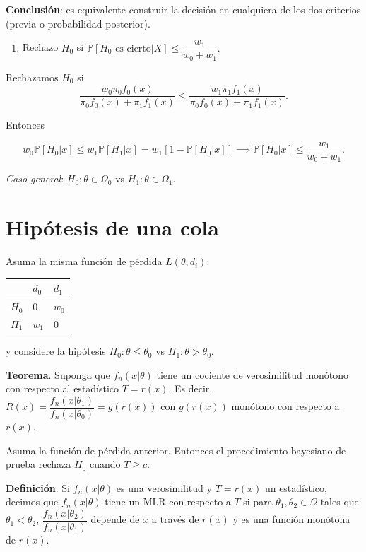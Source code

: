 \documentclass[
  12pt,
]{book}
\providecommand{\tightlist}{%
  \setlength{\itemsep}{0pt}\setlength{\parskip}{0pt}}
\begin{document}
\textbf{Conclusión}: es equivalente construir la decisión en cualquiera de los dos criterios (previa o probabilidad posterior).

\begin{enumerate}
\def\labelenumi{\alph{enumi}.}
\setcounter{enumi}{2}
\tightlist
\item
  Rechazo \(H_0\) si \(\mathbb P[H_0 \text{ es cierto}|X] \leq \dfrac{w_1}{w_0+w_1}.\)
\end{enumerate}

Rechazamos \(H_0\) si
\[\dfrac{w_0\pi_0f_0(x)}{\pi_0f_0(x)+\pi_1f_1(x)}\leq \dfrac{w_1\pi_1f_1(x)}{\pi_0f_0(x)+\pi_1f_1(x)}.\]

Entonces

\[w_0\mathbb P[H_0|x] \leq w_1\mathbb P[H_1|x] = w_1[1-\mathbb P[H_0|x]] \implies\mathbb P[H_0|x]\leq \dfrac{w_1}{w_0+w_1}. \]

\emph{Caso general}: \(H_0: \theta \in \Omega_0\) vs \(H_1: \theta \in \Omega_1\).

\hypertarget{hipuxf3tesis-de-una-cola}{%
\section{Hipótesis de una cola}\label{hipuxf3tesis-de-una-cola}}

Asuma la misma función de pérdida \(L(\theta,d_i)\):

\begin{longtable}[]{@{}lll@{}}
\toprule
& \(d_0\) & \(d_1\)\tabularnewline
\midrule
\endhead
\(H_0\) & 0 & \(w_0\)\tabularnewline
\(H_1\) & \(w_1\) & 0\tabularnewline
\bottomrule
\end{longtable}

y considere la hipótesis \(H_0: \theta \leq \theta_0\) vs \(H_1: \theta > \theta_0\).

\textbf{Teorema}. Suponga que \(f_n(x|\theta)\) tiene un cociente de verosimilitud monótono con respecto al estadístico \(T=r(x)\). Es decir,
\(R(x) = \dfrac{f_n(x|\theta_1)}{f_n(x|\theta_0)} = g(r(x))\)
con \(g(r(x))\) monótono con respecto a \(r(x)\).

Asuma la función de pérdida anterior. Entonces el procedimiento bayesiano de prueba rechaza \(H_0\) cuando \(T\geq c\).

\textbf{Definición}. Si \(f_n(x|\theta)\) es una verosimilitud y \(T=r(x)\) un estadístico, decimos que \(f_n(x|\theta)\) tiene un MLR con respecto a \(T\) si para \(\theta_1,\theta_2 \in \Omega\) tales que \(\theta_1 <\theta_2\), \(\dfrac{f_n(x|\theta_2)}{f_n(x|\theta_1)}\) depende de \(x\) a través de \(r(x)\) y es una función monótona de \(r(x)\).
\end{document}
